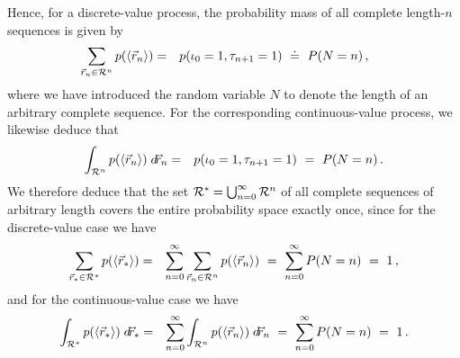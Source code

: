\documentclass[a4paper]{article}
\begin{document}
Hence, for a discrete-value process, the probability mass of all complete length-$n$ sequences is given by
\begin{eqnarray}
\hspace*{-5mm}
\sum_{\vec{r}_n\in{\cal R}^n}
p(\langle\vec{r}_n\rangle)
& = & p(\iota_0=1,\tau_{n+1}=1)
~\doteq~P(N=n)\,,
\end{eqnarray}
where we have introduced the random variable $N$ to denote the length of an
arbitrary complete sequence. 
For the corresponding continuous-value process, we likewise deduce that
\begin{eqnarray}
\int_{{\cal R}^n}
p(\langle\vec{r}_n\rangle)\;d\!\vec{r}_n
& = & 
p(\iota_0=1,\tau_{n+1}=1)
~=~P(N=n)\,.
\end{eqnarray}
We therefore deduce that the set ${\cal R}^{*}=\bigcup_{n=0}^{\infty}{\cal R}^n$ 
of all complete sequences of arbitrary length
covers the entire probability space exactly once, since for the discrete-value case we have
\begin{eqnarray}
\sum_{\vec{r}_{*}\in{\cal R}^{*}}
p(\langle\vec{r}_{*}\rangle)
& = & \sum_{n=0}^{\infty}
\sum_{\vec{r}_n\in{\cal R}^n}
p(\langle\vec{r}_n\rangle)
~=~\sum_{n=0}^{\infty}P(N=n)~=~1\,,
\end{eqnarray}
and for the continuous-value case we have
\begin{eqnarray}
\int_{{\cal R}^{*}}
p(\langle\vec{r}_{*}\rangle)
\;d\!\vec{r}_{*}
& = & \sum_{n=0}^{\infty}
\int_{{\cal R}^n}
p(\langle\vec{r}_n\rangle)
\;d\!\vec{r}_n
~=~\sum_{n=0}^{\infty}P(N=n)~=~1\,.
\end{eqnarray}

\end{document}
